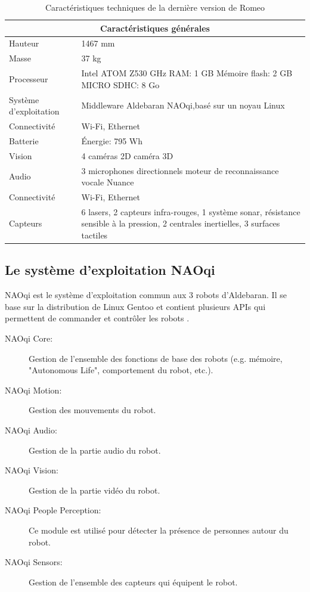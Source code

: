 \begin{table}[H]
	\begin{tabular}{ | l | p{10cm} | }
		\hline
		\multicolumn{2}{|c|}{Caractéristiques générales} \\
		\hline
		Hauteur & 1467 mm \\
		\hline 
		Masse & 37 kg \\
		\hline
		Processeur & Intel ATOM Z530 \newline 1.6 GHz \newline RAM: 1 GB \newline Mémoire flash: 2 GB \newline MICRO SDHC: 8 Go  \\
		\hline
		Système d'exploitation & Middleware Aldebaran NAOqi,\newline basé sur un noyau Linux \\
		\hline
		Connectivité & Wi-Fi, Ethernet \\
		\hline
		Batterie & Énergie: 795 Wh \\
		\hline 
		Vision & 4 caméras 2D \newline 1 caméra 3D \\
		\hline
		Audio & 3 microphones directionnels \newline moteur de reconnaissance vocale Nuance  \\
		\hline
		Connectivité & Wi-Fi, Ethernet \\
		\hline
		Capteurs & 6 lasers, 2 capteurs infra-rouges, 1 système sonar, résistance sensible à la pression, 2 centrales inertielles, 3 surfaces tactiles \\
		\hline
	\end{tabular}
	\caption[Caractéristiques techniques de Romeo]{Caractéristiques techniques de la dernière version de Romeo}
	\label {tab: Caractéristiques techniques de Romeo}
	\cite{RomeoTech}
\end{table}

\subsection{Le système d'exploitation NAOqi}
\label{Entreprise: Les produits: NAOqi}
NAOqi est le système d'exploitation commun aux 3 robots d'Aldebaran. Il se base sur la distribution de Linux Gentoo et contient plusieurs APIs qui permettent de commander et contrôler les robots \cite{NAOqiTech}.
\begin{description}
	\item [NAOqi Core:] Gestion de l'ensemble des fonctions de base des robots (e.g. mémoire, "Autonomous Life", comportement du robot, etc.).
	\item [NAOqi Motion:] Gestion des mouvements du robot.
	\item [NAOqi Audio:]  Gestion de la partie audio du robot.
	\item [NAOqi Vision:] Gestion de la partie vidéo du robot.
	\item [NAOqi People Perception:] Ce module est utilisé pour détecter la présence de personnes autour du robot.
	\item [NAOqi Sensors:]  Gestion de l'ensemble des capteurs qui équipent le robot.
\end{description} 



